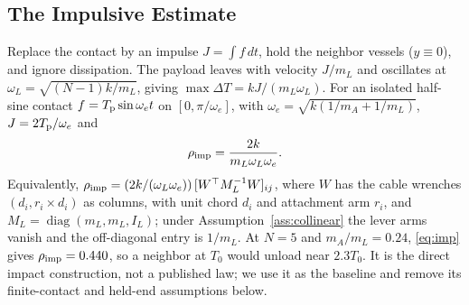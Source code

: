 \subsection{The Impulsive Estimate}
Replace the contact by an impulse $J=\int f\,dt$, hold the neighbor vessels ($y\equiv0$), and ignore dissipation. The payload leaves with velocity $J/m_L$ and oscillates at $\omega_L=\sqrt{(N-1)k/m_L}$, giving $\max\Delta T=kJ/(m_L\omega_L)$. For an isolated half-sine contact $f=T_{\mathrm{p}}\sin\omega_e t$ on $[0,\pi/\omega_e]$, with $\omega_e=\sqrt{k(1/m_A+1/m_L)}$, $J=2T_{\mathrm{p}}/\omega_e$ and
\begin{equation}\label{eq:imp}
  \rho_{\mathrm{imp}}=\frac{2k}{m_L\omega_L\omega_e}.
\end{equation}
Equivalently, $\rho_{\mathrm{imp}}=(2k/(\omega_L\omega_e))\,[W^\top M_L^{-1}W]_{ij}$, where $W$ has the cable wrenches $(d_i,r_i\times d_i)$ as columns, with unit chord $d_i$ and attachment arm $r_i$, and $M_L=\operatorname{diag}(m_L,m_L,I_L)$; under Assumption~\ref{ass:collinear} the lever arms vanish and the off-diagonal entry is $1/m_L$.
At $N=5$ and $m_A/m_L=0.24$, \eqref{eq:imp} gives $\rho_{\mathrm{imp}}=0.440$, so a neighbor at $T_0$ would unload near $2.3T_0$. It is the direct impact construction, not a published law; we use it as the baseline and remove its finite-contact and held-end assumptions below.
